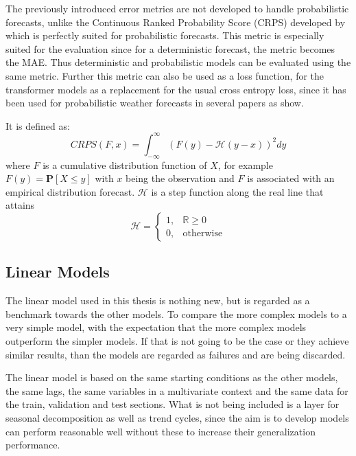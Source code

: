 \documentclass{article}
\begin{document}
The previously introduced error metrics are not developed to handle probabilistic forecasts, unlike the Continuous Ranked Probability Score (CRPS) developed by \cite{Loss_Function} which is perfectly suited for probabilistic forecasts. This metric is especially suited for the evaluation since for a deterministic forecast, the metric becomes the MAE. Thus deterministic and probabilistic models can be evaluated using the same metric. Further this metric can also be used as a loss function, for the transformer models as a replacement for the usual cross entropy loss, since it has been used for probabilistic weather forecasts in several papers as \cite{CRPS_example_1, CRPS_example_2, CRPS_example_3} show. \par 
It is defined as:
\begin{equation}
    CRPS(F, x) = \int_{-\infty}^{\infty} ( F(y) - \mathcal{H}(y-x) )^{2} dy
\end{equation}
where $F$ is a cumulative distribution function of $X$, for example $F(y) = \mathbf{P}[X \leq y]$ with $x$ being the observation and $F$ is associated with an empirical distribution forecast. $\mathcal{H}$ is a step function along the real line that attains
\begin{equation}
    \mathcal{H} = \begin{cases}
        1, & \mathbb{R} \geq 0 \\
        0, & \text{otherwise}
    \end{cases}
\end{equation}

\subsection{Linear Models}

The linear model used in this thesis is nothing new, but is regarded as a benchmark towards the other models. To compare the more complex models to a very simple model, with the expectation that the more complex models outperform the simpler models. If that is not going to be the case or they achieve similar results, than the models are regarded as failures and are being discarded. \par 

The linear model is based on the same starting conditions as the other models, the same lags, the same variables in a multivariate context and the same data for the train, validation and test sections. What is not being included is a layer for seasonal decomposition as well as trend cycles, since the aim is to develop models can perform reasonable well without these to increase their generalization performance. 
\end{document}
